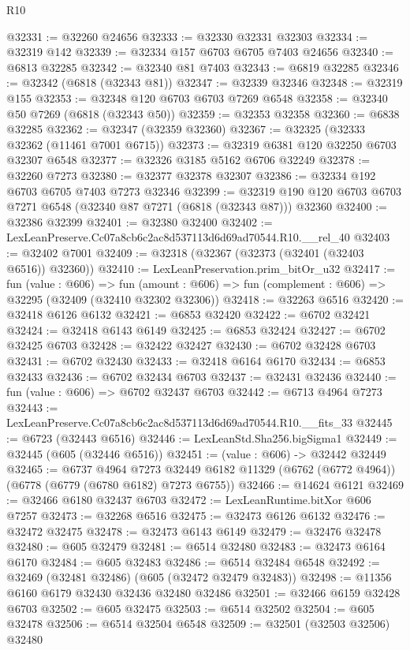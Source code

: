 \begin{lexlean}{R10}
\begin{coremodule}
@32331 := @32260 @24656
@32333 := @32330 @32331 @32303
@32334 := @32319 @142
@32339 := @32334 @157 @6703 @6705 @7403 @24656
@32340 := @6813 @32285
@32342 := @32340 @81 @7403
@32343 := @6819 @32285
@32346 := @32342 (@6818 (@32343 @81))
@32347 := @32339 @32346
@32348 := @32319 @155
@32353 := @32348 @120 @6703 @6703 @7269 @6548
@32358 := @32340 @50 @7269 (@6818 (@32343 @50))
@32359 := @32353 @32358
@32360 := @6838 @32285
@32362 := @32347 (@32359 @32360)
@32367 := @32325 (@32333 @32362 (@11461 @7001 @6715))
@32373 := @32319 @6381 @120 @32250 @6703 @32307 @6548
@32377 := @32326 @3185 @5162 @6706 @32249
@32378 := @32260 @7273
@32380 := @32377 @32378 @32307
@32386 := @32334 @192 @6703 @6705 @7403 @7273 @32346
@32399 := @32319 @190 @120 @6703 @6703 @7271 @6548 (@32340 @87 @7271 (@6818 (@32343 @87))) @32360
@32400 := @32386 @32399
@32401 := @32380 @32400
@32402 := LexLeanPreserve.Cc07a8cb6c2ac8d537113d6d69ad70544.R10.__rel_40
@32403 := @32402 @7001
@32409 := @32318 (@32367 (@32373 (@32401 (@32403 @6516)) @32360))
@32410 := LexLeanPreservation.prim_bitOr_u32
@32417 := fun (value : @606) =>
  fun (amount : @606) => fun (complement : @606) => @32295 (@32409 (@32410 @32302 @32306))
@32418 := @32263 @6516
@32420 := @32418 @6126 @6132
@32421 := @6853 @32420
@32422 := @6702 @32421
@32424 := @32418 @6143 @6149
@32425 := @6853 @32424
@32427 := @6702 @32425 @6703
@32428 := @32422 @32427
@32430 := @6702 @32428 @6703
@32431 := @6702 @32430
@32433 := @32418 @6164 @6170
@32434 := @6853 @32433
@32436 := @6702 @32434 @6703
@32437 := @32431 @32436
@32440 := fun (value : @606) => @6702 @32437 @6703
@32442 := @6713 @4964 @7273
@32443 := LexLeanPreserve.Cc07a8cb6c2ac8d537113d6d69ad70544.R10.__fits_33
@32445 := @6723 (@32443 @6516)
@32446 := LexLeanStd.Sha256.bigSigma1
@32449 := @32445 (@605 (@32446 @6516))
@32451 := (value : @606) -> @32442 @32449
@32465 := @6737
    @4964
    @7273
    @32449
    @6182
    @11329
    (@6762 (@6772 @4964))
    (@6778 (@6779 (@6780 @6182) @7273 @6755))
@32466 := @14624 @6121
@32469 := @32466 @6180 @32437 @6703
@32472 := LexLeanRuntime.bitXor @606 @7257
@32473 := @32268 @6516
@32475 := @32473 @6126 @6132
@32476 := @32472 @32475
@32478 := @32473 @6143 @6149
@32479 := @32476 @32478
@32480 := @605 @32479
@32481 := @6514 @32480
@32483 := @32473 @6164 @6170
@32484 := @605 @32483
@32486 := @6514 @32484 @6548
@32492 := @32469 (@32481 @32486) (@605 (@32472 @32479 @32483))
@32498 := @11356 @6160 @6179 @32430 @32436 @32480 @32486
@32501 := @32466 @6159 @32428 @6703
@32502 := @605 @32475
@32503 := @6514 @32502
@32504 := @605 @32478
@32506 := @6514 @32504 @6548
@32509 := @32501 (@32503 @32506) @32480

\end{coremodule}
\end{lexlean}

